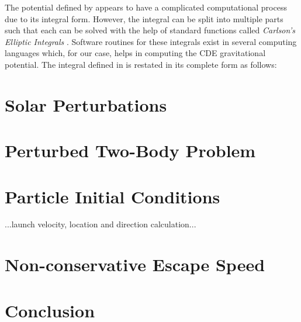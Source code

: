 %
\newline\newline
%
The potential defined by  appears to have a complicated computational process due to its integral form. However, the integral can be split into multiple parts such that each can be solved with the help of standard functions called \textit{Carlson's Elliptic Integrals} \parencite{carlsonEllipticIntegral}. Software routines for these integrals exist in several computing languages which, for our case, helps in computing the \gls{CDE} gravitational potential. The integral defined in  is restated in its complete form as follows:


\section{Solar Perturbations}
\label{sec:solar_perturbations}

\section{Perturbed Two-Body Problem}
\label{sec:2BP}

\section{Particle Initial Conditions}
\label{sec:init_conditions}
...launch velocity, location and direction calculation...

\section{Non-conservative Escape Speed}
\label{sec:escape_speed_derivation}

\section{Conclusion}
\label{sec:dynamics_conclusion}
